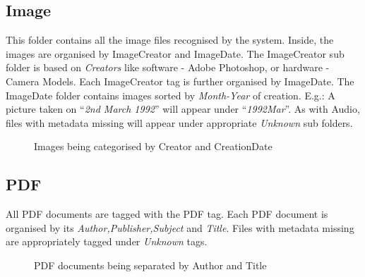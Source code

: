 \subsection{Image}
This folder contains all the image files recognised by the system. Inside, the images are organised by ImageCreator and ImageDate. 
The ImageCreator sub folder is based on \textit{Creators} like software - Adobe Photoshop, or hardware - Camera Models. Each ImageCreator tag is further organised by ImageDate. 
The ImageDate folder contains images sorted by \textit{Month-Year} of creation. E.g.: A picture taken on ``\textit{2nd March 1992}'' will appear under ``\textit{1992Mar}''.
As with Audio, files with metadata missing will appear under appropriate \textit{Unknown} sub folders.
\begin{figure}[htb]
\centering
\setlength\fboxsep{0pt}
\setlength\fboxrule{0.5pt}
\caption{Images being categorised by Creator and CreationDate}
\label{fig:dfd0}
\end{figure}

\subsection{PDF}
All PDF documents are tagged with the PDF tag. Each PDF document is organised by its \textit{Author,Publisher,Subject} and \textit{Title}. Files with metadata missing are appropriately tagged under \textit{Unknown} tags.
\begin{figure}[htb]
\centering
\setlength\fboxsep{0pt}
\setlength\fboxrule{0.5pt}
\caption{PDF documents being separated by Author and Title}
\label{fig:dfd0}
\end{figure}

